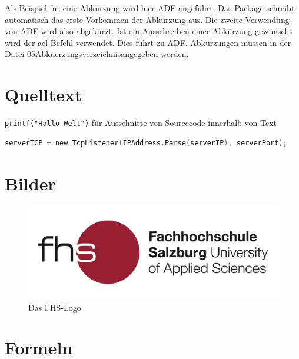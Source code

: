 Als Beispiel für eine Abkürzung wird hier \ac{ADF} angeführt. Das Package schreibt automatisch das erste Vorkommen der Abkürzung aus. Die zweite Verwendung von \ac{ADF} wird also abgekürzt. Ist ein Ausschreiben einer Abkürzung gewünscht wird der acl-Befehl verwendet. Dies führt zu \acl{ADF}. Abkürzungen müssen in der Datei \glqq 05Abkuerzungsverzeichnis\grqq angegeben werden.

\section{Quelltext}

\texttt{printf("Hallo Welt")} für Ausschnitte von Sourcecode innerhalb von Text

\begin{lstlisting}[language=C,
caption=Beispiel-Listing,
label=LST_SAMPLE]
serverTCP = new TcpListener(IPAddress.Parse(serverIP), serverPort);
\end{lstlisting}



\section{Bilder}

\begin{figure}[H]
\begin{center}
	\includegraphics[scale=0.4]{BilderAllgemein/Logo.jpg}
\end{center}
	\caption{Das FHS-Logo}
	\label{FIG_LOGO}
\end{figure}

\section{Formeln}

